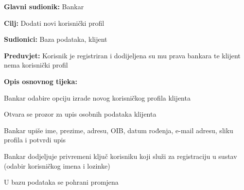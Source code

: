             \noindent {}
            \begin{packed_item}
                
                  \item \textbf{Glavni sudionik: }Bankar
                  \item  \textbf{Cilj:} Dodati novi korisnički profil
                  \item  \textbf{Sudionici:} Baza podataka, klijent
                  \item  \textbf{Preduvjet:} Korisnik je registriran i dodijeljena su mu prava bankara te klijent nema korisnički profil
                  \item  \textbf{Opis osnovnog tijeka:}
                  
                  \item[] \begin{packed_enum}
                
                    \item  Bankar odabire opciju izrade novog korisničkog profila klijenta
                    \item  Otvara se prozor za upis osobnih podataka klijenta
                    \item  Bankar upiše ime, prezime, adresu, OIB, datum rođenja, e-mail adresu, sliku profila i potvrdi upis
                    \item  Bankar dodjeljuje privremeni ključ korisniku koji služi za registraciju u sustav (odabir korisničkog imena i lozinke)
                    \item  U bazu podataka se pohrani promjena                              
                  \end{packed_enum}
                  
                \end{packed_item}
            
                
                
